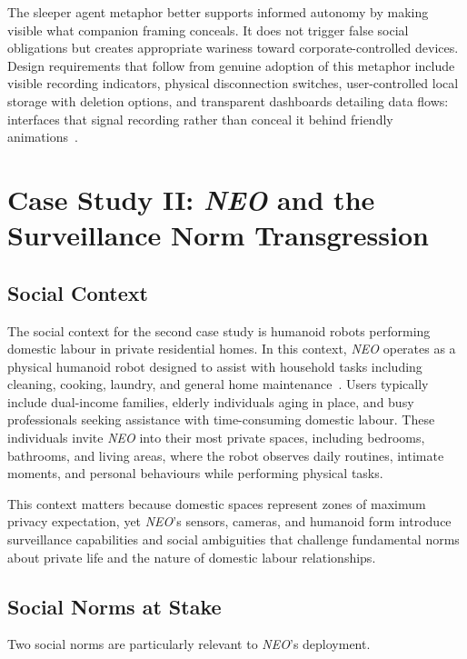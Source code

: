 \documentclass{ieee-portfolio}
\newcommand{\neo}{\textit{NEO}}
\begin{document}
The sleeper agent metaphor better supports informed autonomy by making visible what companion framing conceals. It does not trigger false social obligations but creates appropriate wariness toward corporate-controlled devices. Design requirements that follow from genuine adoption of this metaphor include visible recording indicators, physical disconnection switches, user-controlled local storage with deletion options, and transparent dashboards detailing data flows: interfaces that signal recording rather than conceal it behind friendly animations~\cite{gray_dark_2018}.

\section{Case Study II: \neo{} and the Surveillance Norm Transgression}
\label{sec:neo}

\subsection{Social Context}

The social context for the second case study is humanoid robots performing domestic labour in private residential homes. In this context, \neo{} operates as a physical humanoid robot designed to assist with household tasks including cleaning, cooking, laundry, and general home maintenance~\cite{bornich_meet_2025}. Users typically include dual-income families, elderly individuals aging in place, and busy professionals seeking assistance with time-consuming domestic labour. These individuals invite \neo{} into their most private spaces, including bedrooms, bathrooms, and living areas, where the robot observes daily routines, intimate moments, and personal behaviours while performing physical tasks.

This context matters because domestic spaces represent zones of maximum privacy expectation, yet \neo{}'s sensors, cameras, and humanoid form introduce surveillance capabilities and social ambiguities that challenge fundamental norms about private life and the nature of domestic labour relationships.

\subsection{Social Norms at Stake}

Two social norms are particularly relevant to \neo{}'s deployment.
\end{document}
